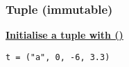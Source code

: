 \subsubsection{Tuple (immutable)}
{\centering\underline{\textbf{Initialise a tuple with ()}} \par}
\begin{lstlisting}
t = ("a", 0, -6, 3.3)
\end{lstlisting}